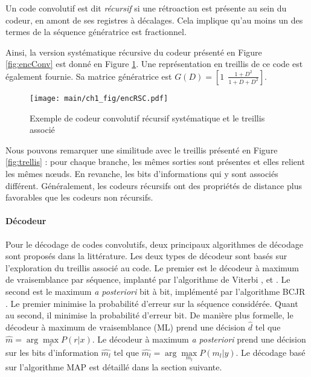 Un code convolutif est dit \emph{récursif} si une rétroaction est présente au sein du codeur, en amont de ses registres à décalages. Cela 
implique qu'au moins un des termes de la séquence génératrice est fractionnel. 

Ainsi, la version systématique récursive du codeur présenté en Figure \ref{fig:encConv} est donné en Figure 
\ref{fig:encRSC}. Une représentation en treillis de ce code est également fournie. Sa matrice génératrice est $G(D) = \left[ 1 ~~\frac{1+D^2}{1+D+D^2} \right]$. 
\begin{figure}[!h]
	\centering
	\texttt{[image: main/ch1\_fig/encRSC.pdf]}
	\caption{\label{fig:encRSC} Exemple de codeur convolutif récursif systématique et le treillis associé}
\end{figure}
Nous pouvons remarquer une similitude avec le treillis présenté en Figure \ref{fig:trellis} : pour chaque branche,
les mêmes sorties sont présentes et elles relient les mêmes nœuds. En revanche, les bits d'informations qui y sont 
associés différent. Généralement, les codeurs récursifs ont des propriétés de distance plus favorables que les codeurs
non récursifs.

\paragraph*{Décodeur}
Pour le décodage de codes convolutifs, deux principaux algorithmes de décodage sont proposés dans la littérature. Les 
deux types de décodeur sont basés sur l'exploration du treillis associé au code. Le premier est le décodeur à maximum de 
vraisemblance par séquence, implanté par l'algorithme de Viterbi \cite{viterbi}, \cite{viterbi2} et \cite{forney73viterbi}. 
Le second est le maximum {\it a posteriori} bit à bit, implémenté par l'algorithme BCJR \cite{bcjr}. Le premier 
minimise la probabilité d'erreur sur la séquence considérée.
Quant au second, il minimise la probabilité d'erreur bit. De 
manière plus formelle, le décodeur à maximum de vraisemblance (ML) prend une décision $\hat{d}$ tel que $\hat{m} = 
\arg\max\limits_c P(r|x)$. Le décodeur à maximum {\it a posteriori} prend une décision sur les bits d'information 
$\hat{m_l}$ tel que $\hat{m_l} = \arg\max\limits_{m_l} P(m_l|y)$. Le décodage basé sur l'algorithme MAP est détaillé 
dans la section suivante.


